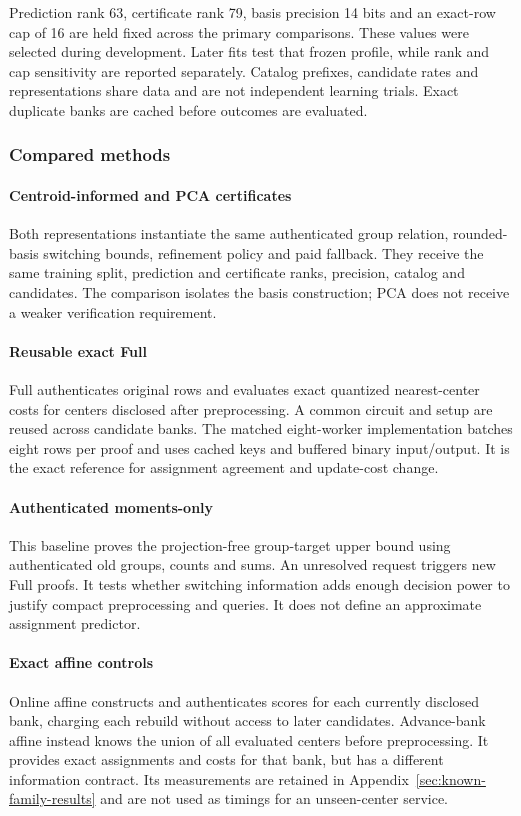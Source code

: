 Prediction rank 63, certificate rank 79, basis precision 14 bits and an
exact-row cap of 16 are held fixed across the primary comparisons. These
values were selected during development. Later fits test that frozen
profile, while rank and cap sensitivity are reported separately. Catalog
prefixes, candidate rates and representations share data and are not
independent learning trials. Exact duplicate banks are cached before
outcomes are evaluated.

\subsubsection{Compared methods}
\paragraph{Centroid-informed and PCA certificates}
Both representations instantiate the same authenticated group relation,
rounded-basis switching bounds, refinement policy and paid fallback. They
receive the same training split, prediction and certificate ranks, precision,
catalog and candidates. The comparison isolates the basis construction;
PCA does not receive a weaker verification requirement.

\paragraph{Reusable exact Full}
Full authenticates original rows and evaluates exact quantized
nearest-center costs for centers disclosed after preprocessing. A common
circuit and setup are reused across candidate banks. The matched eight-worker
implementation batches eight rows per proof and uses cached keys and
buffered binary input/output. It is the exact reference for assignment
agreement and update-cost change.

\paragraph{Authenticated moments-only}
This baseline proves the projection-free group-target upper bound using
authenticated old groups, counts and sums. An unresolved request triggers
new Full proofs. It tests whether switching information adds enough decision
power to justify compact preprocessing and queries. It does not define an
approximate assignment predictor.

\paragraph{Exact affine controls}
Online affine constructs and authenticates scores for each currently
disclosed bank, charging each rebuild without access to later candidates.
Advance-bank affine instead knows the union of all evaluated centers before
preprocessing. It provides exact assignments and costs for that bank, but
has a different information contract. Its measurements are retained in
Appendix~\ref{sec:known-family-results} and are not used as timings for an
unseen-center service.

